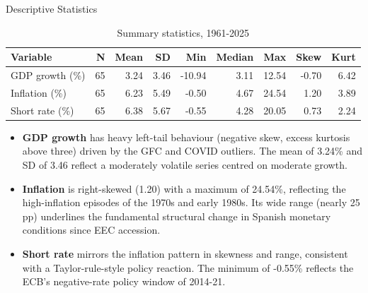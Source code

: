 \documentclass[9pt]{beamer}
\begin{document}
\begin{frame}{Descriptive Statistics}

\begin{table}[ht]
\centering
\footnotesize
\caption{\footnotesize Summary statistics, 1961-2025}
\begin{tabular}{lrrrrrrrr}
\toprule
\textbf{Variable} & \textbf{N} & \textbf{Mean} & \textbf{SD} & \textbf{Min} & \textbf{Median} & \textbf{Max} & \textbf{Skew} & \textbf{Kurt} \\
\midrule
GDP growth (\%) & 65 & 3.24 & 3.46 & -10.94 & 3.11 & 12.54 & -0.70 & 6.42 \\
Inflation (\%)  & 65 & 6.23 & 5.49 & -0.50  & 4.67 & 24.54 &  1.20 & 3.89 \\
Short rate (\%) & 65 & 6.38 & 5.67 & -0.55  & 4.28 & 20.05 &  0.73 & 2.24 \\
\bottomrule
\end{tabular}
\label{tab:summary_stats}
\end{table}

{\footnotesize
\begin{itemize}
    \item \textbf{GDP growth} has heavy left-tail behaviour (negative skew, excess kurtosis above three) driven by the GFC and COVID outliers. The mean of 3.24\% and SD of 3.46 reflect a moderately volatile series centred on moderate growth.

    \item \textbf{Inflation} is right-skewed (1.20) with a maximum of 24.54\%, reflecting the high-inflation episodes of the 1970s and early 1980s. Its wide range (nearly 25 pp) underlines the fundamental structural change in Spanish monetary conditions since EEC accession.

    \item \textbf{Short rate} mirrors the inflation pattern in skewness and range, consistent with a Taylor-rule-style policy reaction. The minimum of -0.55\% reflects the ECB's negative-rate policy window of 2014-21.
\end{itemize}
}

\end{frame}
\end{document}
